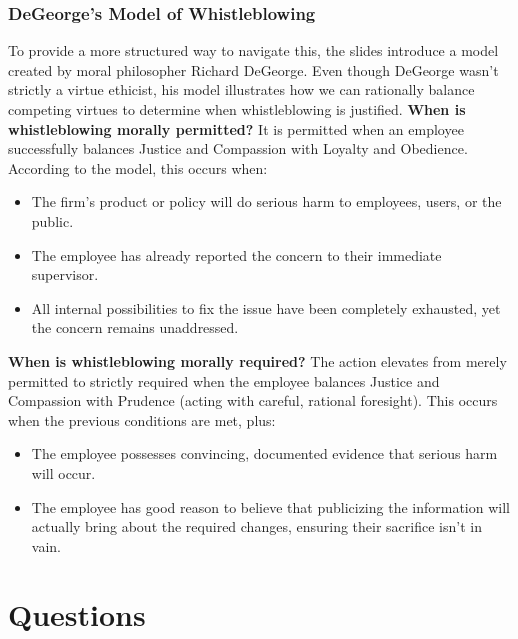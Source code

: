 \documentclass[12pt]{article}
\begin{document}
\subsubsection{DeGeorge's Model of Whistleblowing}
To provide a more structured way to navigate this, the slides introduce a model created by moral philosopher Richard DeGeorge. Even though DeGeorge wasn't strictly a virtue ethicist, his model illustrates how we can rationally balance competing virtues to determine when whistleblowing is justified.\newline
\textbf{When is whistleblowing morally permitted?} It is permitted when an employee successfully balances Justice and Compassion with Loyalty and Obedience. According to the model, this occurs when:
\begin{itemize}
    \item The firm's product or policy will do serious harm to employees, users, or the public.
    \item The employee has already reported the concern to their immediate supervisor.
    \item All internal possibilities to fix the issue have been completely exhausted, yet the concern remains unaddressed.
\end{itemize}
\textbf{When is whistleblowing morally required?} The action elevates from merely permitted to strictly required when the employee balances Justice and Compassion with Prudence (acting with careful, rational foresight). This occurs when the previous conditions are met, plus:
\begin{itemize}
    \item The employee possesses convincing, documented evidence that serious harm will occur.
    \item The employee has good reason to believe that publicizing the information will actually bring about the required changes, ensuring their sacrifice isn't in vain.
\end{itemize}


\newpage

\section{Questions}
\end{document}
